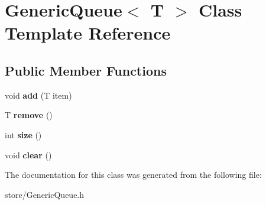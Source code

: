 \hypertarget{classGenericQueue}{}\section{Generic\+Queue$<$ T $>$ Class Template Reference}
\label{classGenericQueue}
\subsection*{Public Member Functions}
\begin{DoxyCompactItemize}
\item 
void {\bfseries add} (T item)\hypertarget{classGenericQueue_af5de20e93f3ee8d1fdd38a8ec1ae52f6}{}\label{classGenericQueue_af5de20e93f3ee8d1fdd38a8ec1ae52f6}

\item 
T {\bfseries remove} ()\hypertarget{classGenericQueue_a15366cdc3234d238c664c82524f14c0b}{}\label{classGenericQueue_a15366cdc3234d238c664c82524f14c0b}

\item 
int {\bfseries size} ()\hypertarget{classGenericQueue_aa94c712ca621ef5c121cd4f9c9188f67}{}\label{classGenericQueue_aa94c712ca621ef5c121cd4f9c9188f67}

\item 
void {\bfseries clear} ()\hypertarget{classGenericQueue_a0fd02ceeecaf5c0903e3ee7199b183bc}{}\label{classGenericQueue_a0fd02ceeecaf5c0903e3ee7199b183bc}

\end{DoxyCompactItemize}


The documentation for this class was generated from the following file\+:\begin{DoxyCompactItemize}
\item 
store/Generic\+Queue.\+h\end{DoxyCompactItemize}
